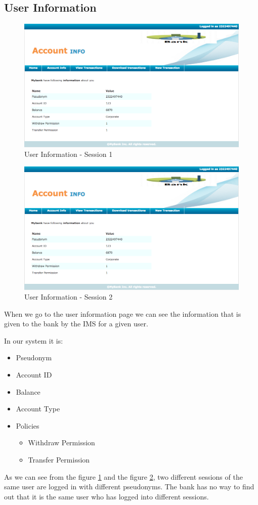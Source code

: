 \subsection{User Information}
\begin{figure}[h]
	\centering
	\includegraphics[width=\textwidth]{figures/Account1}
	\caption{User Information - Session 1}
	\label{fig:Account1}
\end{figure}	
\begin{figure}[h]
	\centering
	\includegraphics[width=\textwidth]{figures/Account1}
	\caption{User Information - Session 2}
	\label{fig:Account2}
\end{figure}
When we go to the user information page we can see the information that is given to the bank by the IMS for a given user.

In our system it is:
\begin{itemize}
	\item Pseudonym
	\item Account ID
	\item Balance
	\item Account Type
	\item Policies
	\begin{itemize}
		\item Withdraw Permission
		\item Transfer Permission
	\end{itemize}
\end{itemize}
As we can see from the figure \ref{fig:Account1} and the figure \ref{fig:Account2}, two different sessions of the same user are logged in with different pseudonyms. The bank has no way to find out that it is the same user who has logged into different sessions.

